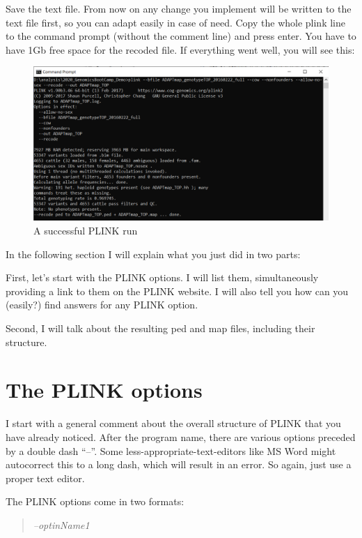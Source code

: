 \documentclass[]{book}
\begin{document}
Save the text file. From now on any change you implement will be written
to the text file first, so you can adapt easily in case of need. Copy
the whole plink line to the command prompt (without the comment line)
and press enter. You have to have 1Gb free space for the recoded file.
If everything went well, you will see this:

\begin{figure}
\includegraphics[width=15.22in]{images/7-1-cmdSuccessfulPlinkRun} \caption{A successful PLINK run}\label{fig:fig7-1}
\end{figure}

In the following section I will explain what you just did in two parts:

First, let's start with the PLINK options. I will list them,
simultaneously providing a link to them on the PLINK website. I will
also tell you how can you (easily?) find answers for any PLINK option.

Second, I will talk about the resulting ped and map files, including
their structure.

\section{The PLINK options}\label{the-plink-options}

I start with a general comment about the overall structure of PLINK that
you have already noticed. After the program name, there are various
options preceded by a double dash ``--''. Some
less-appropriate-text-editors like MS Word might autocorrect this to a
long dash, which will result in an error. So again, just use a proper
text editor.

The PLINK options come in two formats:

\begin{quote}
\emph{--optinName1}
\end{quote}
\end{document}
